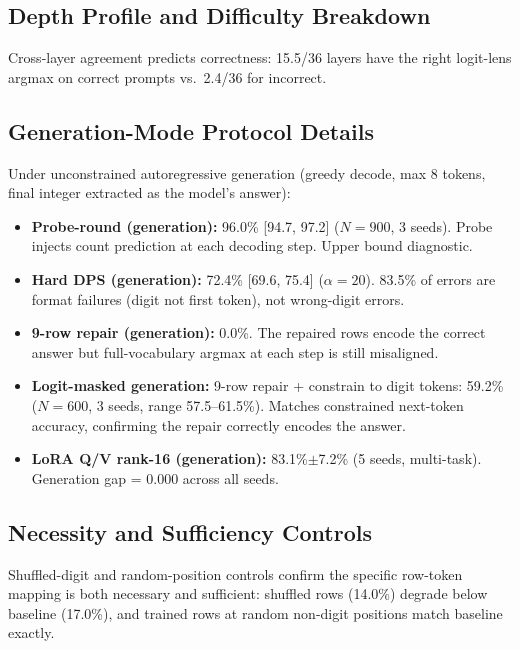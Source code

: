 \documentclass{article}
\begin{document}
\subsection{Depth Profile and Difficulty Breakdown}
\label{sec:depth_difficulty}

Cross-layer agreement predicts correctness: 15.5/36 layers have the right
logit-lens argmax on correct prompts vs.\ 2.4/36 for incorrect.

\subsection{Generation-Mode Protocol Details}
\label{sec:genmode_details}

Under unconstrained autoregressive generation (greedy decode, max 8 tokens,
final integer extracted as the model's answer):

\begin{itemize}
\item \textbf{Probe-round (generation):} 96.0\% [94.7, 97.2] ($N{=}900$, 3
  seeds). Probe injects count prediction at each decoding step. Upper bound
  diagnostic.
\item \textbf{Hard DPS (generation):} 72.4\% [69.6, 75.4] ($\alpha{=}20$).
  83.5\% of errors are format failures (digit not first token), not wrong-digit
  errors.
\item \textbf{9-row repair (generation):} 0.0\%. The repaired rows encode the
  correct answer but full-vocabulary argmax at each step is still misaligned.
\item \textbf{Logit-masked generation:} 9-row repair + constrain to digit
  tokens: 59.2\% ($N{=}600$, 3 seeds, range 57.5--61.5\%). Matches constrained
  next-token accuracy, confirming the repair correctly encodes the answer.
\item \textbf{LoRA Q/V rank-16 (generation):} 83.1\%$\pm$7.2\% (5 seeds,
  multi-task). Generation gap = 0.000 across all seeds.
\end{itemize}

\subsection{Necessity and Sufficiency Controls}
\label{sec:necessity_sufficiency}

Shuffled-digit and random-position controls confirm the specific row-token
mapping is both necessary and sufficient: shuffled rows (14.0\%) degrade below
baseline (17.0\%), and trained rows at random non-digit positions match
baseline exactly.
\end{document}
